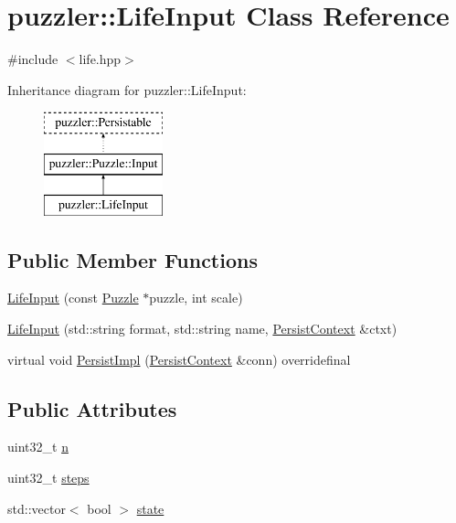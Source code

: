 \hypertarget{a00010}{}\section{puzzler\+:\+:Life\+Input Class Reference}
\label{a00010}


{\ttfamily \#include $<$life.\+hpp$>$}

Inheritance diagram for puzzler\+:\+:Life\+Input\+:\begin{figure}[H]
\begin{center}
\leavevmode
\includegraphics[height=3.000000cm]{a00010}
\end{center}
\end{figure}
\subsection*{Public Member Functions}
\begin{DoxyCompactItemize}
\item 
\hyperlink{a00010_a65cf477e1f0f45d26ba3be077843e58b}{Life\+Input} (const \hyperlink{a00026}{Puzzle} $\ast$puzzle, int scale)
\item 
\hyperlink{a00010_adf2b888b0a803fb46d55f0484e22ae1f}{Life\+Input} (std\+::string format, std\+::string name, \hyperlink{a00025}{Persist\+Context} \&ctxt)
\item 
virtual void \hyperlink{a00010_a61536a5ed7f7d36938c6018f009e90c7}{Persist\+Impl} (\hyperlink{a00025}{Persist\+Context} \&conn) overridefinal
\end{DoxyCompactItemize}
\subsection*{Public Attributes}
\begin{DoxyCompactItemize}
\item 
uint32\+\_\+t \hyperlink{a00010_a67a48222646f2cfeb41fdf562055af79}{n}
\item 
uint32\+\_\+t \hyperlink{a00010_a3d89eae18dea2d1f3cbd2656b6442dfd}{steps}
\item 
std\+::vector$<$ bool $>$ \hyperlink{a00010_ac1dd04f4621b6d7130b52c7f62edaee7}{state}
\end{DoxyCompactItemize}
